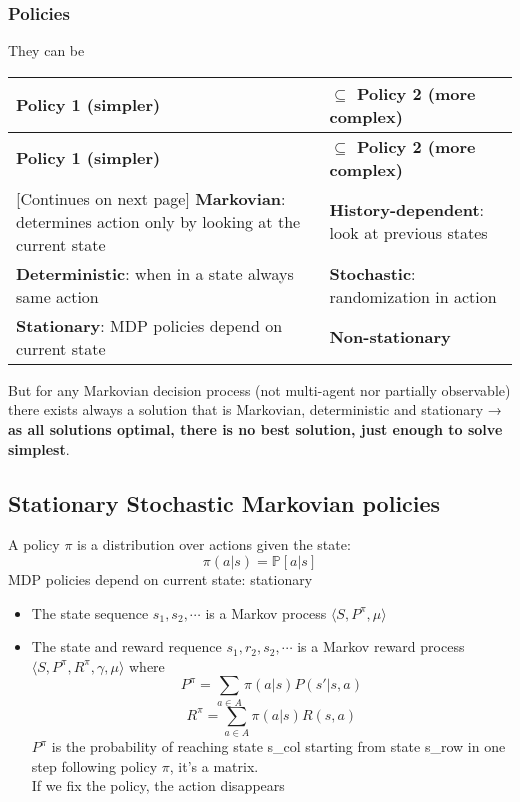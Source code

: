 \subsubsection{Policies}
    They can be
    \begin{tabularx}{\linewidth}{X|X}
        \toprule
        \textbf{Policy 1 (simpler)} & \textbf{$\subseteq$ Policy 2 (more complex)} \\
        \midrule
        \endfirsthead
        \toprule
        \textbf{Policy 1 (simpler)} & \textbf{$\subseteq$ Policy 2 (more complex)} \\
        \midrule
        \endhead
        \midrule
        \footnotesize [Continues on next page]
        \endfoot
        \bottomrule
        \endlastfoot
            \textbf{Markovian}: determines action only by looking at the current state & \textbf{History-dependent}: look at previous states\\ \midrule
            \textbf{Deterministic}: when in a state always same action & \textbf{Stochastic}: randomization in action\\ \midrule
            \textbf{Stationary}: MDP policies depend on current state & \textbf{Non-stationary}
    \end{tabularx}
    But for any Markovian decision process (not multi-agent nor partially observable) there exists always a solution that is Markovian, deterministic and stationary → \textbf{as all solutions optimal, there is no best solution, just enough to solve simplest}.

\subsection{Stationary Stochastic Markovian policies}
    A policy $\pi$ is a distribution over actions given the state:
    $$\pi(a|s)=\mathbb{P}[a|s]$$
    MDP policies depend on current state: stationary
    \begin{itemize}
        \item The state sequence $s_1,s_2,\cdots$ is a Markov process $\langle S,P^{\pi},\mu\rangle$
        \item The state and reward requence $s_1,r_2,s_2,\cdots$ is a Markov reward process $\langle S,P^{\pi},R^{\pi},\gamma,\mu\rangle$ where
        $$P^{\pi}=\sum_{a\in A}\pi(a|s)P(s'|s,a)$$
        $$R^{\pi}=\sum_{a\in A}\pi(a|s)R(s,a)$$
        $P^{\pi}$ is the probability of reaching state s\_col starting from state s\_row in one step following policy $\pi$, it's a matrix.\\
        If we fix the policy, the action disappears
    \end{itemize}
